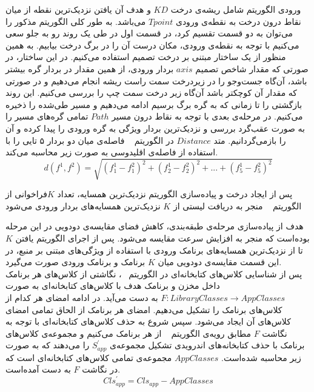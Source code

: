 ورودی الگوریتم شامل ریشه‌ی درخت $KD$ و هدف آن‌ یافتن نزدیک‌ترین نقطه از میان نقاط درون درخت به نقطه‌ی ورودی $Tpoint$ می‌باشد. به طور کلی الگوریتم مذکور را می‌توان به دو قسمت تقسیم کرد، در قسمت اول در طی یک روند رو به جلو سعی می‌کنیم با توجه به نقطه‌ی ورودی، مکان درست آن را در برگ درخت بیابیم. به همین منظور از یک ساختار مبتنی بر درخت تصمیم استفاده می‌کنیم. در این ساختار، در صورتی که  مقدار شاخص تصمیم $axis$ بردار ورودی، از همین مقدار در بردار گره بیشتر باشد، آن‌گاه جست‌و‌جو را در زیر‌درخت سمت راست ریشه انجام می‌دهیم و در صورتی که مقدار آن کوچکتر باشد آن‌گاه زیر درخت سمت چپ را بررسی می‌کنیم. این روند بازگشتی را تا زمانی که به گره برگ برسیم ادامه می‌دهیم و مسیر طی‌شده را ذخیره می‌کنیم. در مرحله‌ی بعدی با توجه به نقاط درون مسیر $Path$ تمامی گره‌های مسیر‌ را به صورت عقب‌گرد بررسی و نزدیک‌ترین بردار ویژگی به گره ورودی را پیدا کرده و آن را بازمی‌گردانیم.
متد $Distance$ در الگوریتم ~ فاصله‌ی میان دو بردار ۵ تایی را با استفاده از فاصله‌ی اقلیدوسی به صورت زیر محاسبه می‌کند.
\begin{equation}
	d(f^1,f^2) = \sqrt{(f^1_{1}-f^2_{1})^2 + (f^1_{2}-f^2_{2})^2  + ... +(f^1_{5}-f^2_{5})^2  }
\end{equation}

پس از ایجاد درخت و پیاده‌سازی الگوریتم نزدیک‌ترین همسایه، تعداد $K $فراخوانی از الگوریتم ~ منجر به دریافت لیستی از $K $ نزدیک‌ترین همسایه‌های بردار ورودی می‌شود

هدف از پیاده‌سازی مرحله‌ی  طبقه‌بندی، کاهش فضای مقایسه‌ی دودویی در این مرحله بوده‌است که منجر به افزایش سرعت مقایسه می‌شود. پس از اجرای الگوریتم یافتن $K$ تا از نزدیک‌ترین همسایه‌های برنامک ورودی با استفاده از ویژگی‌های مبتنی بر منبع، در این قسمت مقایسه‌ی دودویی میان $K$ برنامک و برنامک ورودی صورت می‌گیرد.\\ 
پس از شناسایی کلاس‌های کتابخانه‌ای در الگوریتم ~، نگاشتی از کلاس‌های هر برنامک داخل مخزن و برنامک هدف با کلاس‌های کتابخانه‌ای به صورت $F:LibraryClasses\rightarrow AppClasses$ به دست می‌آید. در ادامه امضای هر کدام از کلاس‌های برنامک را تشکیل می‌دهیم. امضای هر برنامک از الحاق تمامی امضای کلاس‌های آن ایجاد می‌شود. سپس شروع به حذف کلاس‌های کتابخانه‌ای با توجه به نگاشت $F$ مطابق رویه‌ی الگوریتم ~ از هر برنامک می‌کنیم و مجموعه‌ی کلاس‌های برنامک با حذف کتابخانه‌های اندرویدی تشکیل مجموعه‌ی $S^{'}_{app}$ را می‌دهند که به صورت زیر محاسبه شده‌است.  $AppClasses$ مجموعه‌ی تمامی کلاس‌های کتابخانه‌ای است که در نگاشت $F$ به دست آمده‌است.
\begin{equation}
	Cls^{'}_{app} = Cls_{app} - AppClasses
\end{equation}



